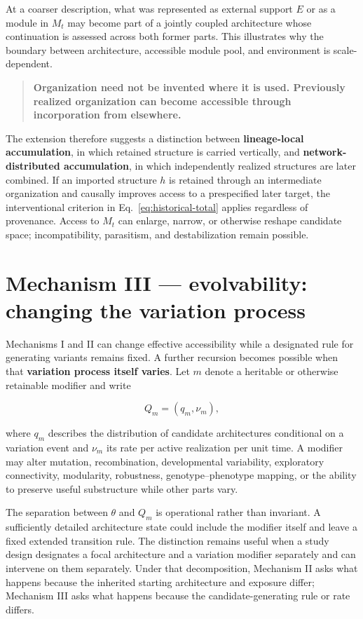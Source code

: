 \documentclass[11pt,a4paper]{article}
\begin{document}
At a coarser description, what was represented as external support $E$ or as a module in $M_t$ may become part of a jointly coupled architecture whose continuation is assessed across both former parts. This illustrates why the boundary between architecture, accessible module pool, and environment is scale-dependent.

\begin{quote}
\textbf{Organization need not be invented where it is used. Previously realized organization can become accessible through incorporation from elsewhere.}
\end{quote}

The extension therefore suggests a distinction between \textbf{lineage-local accumulation}, in which retained structure is carried vertically, and \textbf{network-distributed accumulation}, in which independently realized structures are later combined. If an imported structure $h$ is retained through an intermediate organization and causally improves access to a prespecified later target, the interventional criterion in Eq.~\eqref{eq:historical-total} applies regardless of provenance. Access to $M_t$ can enlarge, narrow, or otherwise reshape candidate space; incompatibility, parasitism, and destabilization remain possible.

\section{Mechanism III --- evolvability: changing the variation process}

Mechanisms I and II can change effective accessibility while a designated rule for generating variants remains fixed. A further recursion becomes possible when that \textbf{variation process itself varies}. Let $m$ denote a heritable or otherwise retainable modifier and write

\[
Q_m=(q_m,\nu_m),
\]

where $q_m$ describes the distribution of candidate architectures conditional on a variation event and $\nu_m$ its rate per active realization per unit time. A modifier may alter mutation, recombination, developmental variability, exploratory connectivity, modularity, robustness, genotype--phenotype mapping, or the ability to preserve useful substructure while other parts vary.

The separation between $\theta$ and $Q_m$ is operational rather than invariant. A sufficiently detailed architecture state could include the modifier itself and leave a fixed extended transition rule. The distinction remains useful when a study design designates a focal architecture and a variation modifier separately and can intervene on them separately. Under that decomposition, Mechanism II asks what happens because the inherited starting architecture and exposure differ; Mechanism III asks what happens because the candidate-generating rule or rate differs.
\end{document}
